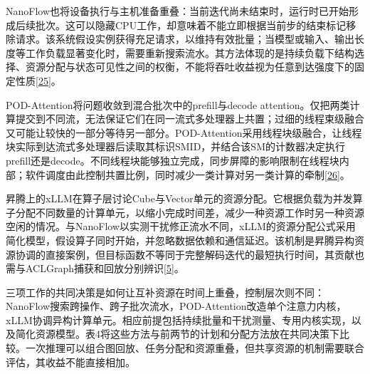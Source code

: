 \documentclass[UTF8,11pt,fontset=windows]{ctexart}
\begin{document}
NanoFlow也将设备执行与主机准备重叠：当前迭代尚未结束时，运行时已开始形成后续批次。这可以隐藏CPU工作，却意味着不能立即根据当前步的结束标记移除请求。该系统假设实例获得充足请求，以维持有效批量；当模型或输入、输出长度等工作负载显著变化时，需要重新搜索流水。其方法体现的是持续负载下结构选择、资源分配与状态可见性之间的权衡，不能将吞吐收益视为任意到达强度下的固定性质\protect\hyperlink{ref-25}{{[}25{]}}。

POD-Attention将问题收敛到混合批次中的prefill与decode attention。仅把两类计算提交到不同流，无法保证它们在同一流式多处理器上共置；过细的线程束级融合又可能让较快的一部分等待另一部分。POD-Attention采用线程块级融合，让线程块实际到达流式多处理器后读取其标识SMID，并结合该SM的计数器决定执行prefill还是decode。不同线程块能够独立完成，同步屏障的影响限制在线程块内部；软件调度由此控制共置比例，同时减少一类计算对另一类计算的牵制\protect\hyperlink{ref-26}{{[}26{]}}。

昇腾上的xLLM在算子层讨论Cube与Vector单元的资源分配。它根据负载为并发算子分配不同数量的计算单元，以缩小完成时间差，减少一种资源工作时另一种资源空闲的情况。与NanoFlow以实测干扰修正流水不同，xLLM的资源分配公式采用简化模型，假设算子同时开始，并忽略数据依赖和通信延迟。该机制是昇腾异构资源协调的直接案例，但目标函数不等同于完整解码迭代的最短执行时间，其贡献也需与ACLGraph捕获和回放分别辨识\protect\hyperlink{ref-5}{{[}5{]}}。

三项工作的共同决策是如何让互补资源在时间上重叠，控制层次则不同：NanoFlow搜索跨操作、跨子批次流水，POD-Attention改造单个注意力内核，xLLM协调异构计算单元。相应前提包括持续批量和干扰测量、专用内核实现，以及简化资源模型。表4将这些方法与前两节的计划和分配方法放在共同决策下比较。一次推理可以组合图回放、任务分配和资源重叠，但共享资源的机制需要联合评估，其收益不能直接相加。
\end{document}

